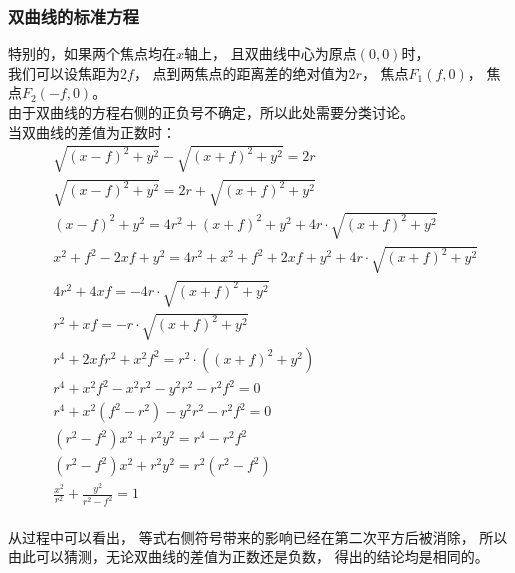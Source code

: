 \documentclass[UTF8]{ctexart}
\begin{document}
\subsubsection{双曲线的标准方程}
    特别的，如果两个焦点均在$x$轴上，
    且双曲线中心为原点$(0,0)$时，\\
    我们可以设焦距为$2f$，
    点到两焦点的距离差的绝对值为$2r$，
    焦点$F_1(f,0)$，
    焦点$F_2(-f,0)$。\\[3mm]
    由于双曲线的方程右侧的正负号不确定，所以此处需要分类讨论。\\[3mm]
    当双曲线的差值为正数时：\vspace{8pt}
    \setcounter{equation}{0}
    \begin{align}
        &\sqrt{(x-f)^2+y^2}-\sqrt{(x+f)^2+y^2}=2r\\[4mm]
        &\sqrt{(x-f)^2+y^2}=2r+\sqrt{(x+f)^2+y^2}\\[4mm]
        &(x-f)^2+y^2=4r^2+(x+f)^2+y^2+4r \cdot \sqrt{(x+f)^2+y^2}\\[4mm]
        &x^2+f^2-2xf+y^2=4r^2+x^2+f^2+2xf+y^2+4r \cdot \sqrt{(x+f)^2+y^2}\\[4mm]
        &4r^2+4xf=-4r \cdot \sqrt{(x+f)^2+y^2}\\[4mm]
        &r^2+xf=-r \cdot \sqrt{(x+f)^2+y^2}\\[4mm]
        &r^4+2xfr^2+x^2f^2=r^2 \cdot ((x+f)^2+y^2)\\[4mm]
        &r^4+x^2f^2-x^2r^2-y^2r^2-r^2f^2=0\\[4mm]
        &r^4+x^2(f^2-r^2)-y^2r^2-r^2f^2=0\\[4mm]
        &(r^2-f^2)x^2+r^2y^2=r^4-r^2f^2\\[4mm]
        &(r^2-f^2)x^2+r^2y^2=r^2(r^2-f^2)\\[4mm]
        &\frac{x^2}{r^2}+\frac{y^2}{r^2-f^2}=1
    \end{align}\\[3mm]
    从过程中可以看出，
    等式右侧符号带来的影响已经在第二次平方后被消除，
    所以由此可以猜测，无论双曲线的差值为正数还是负数，
    得出的结论均是相同的。

\newpage
\end{document}
